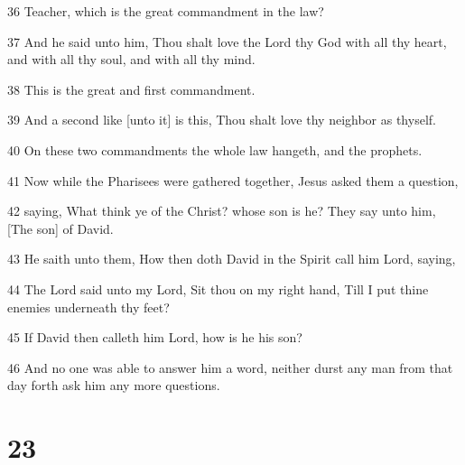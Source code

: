 \par 36 Teacher, which is the great commandment in the law?
\par 37 And he said unto him, Thou shalt love the Lord thy God with all thy heart, and with all thy soul, and with all thy mind.
\par 38 This is the great and first commandment.
\par 39 And a second like [unto it] is this, Thou shalt love thy neighbor as thyself.
\par 40 On these two commandments the whole law hangeth, and the prophets.
\par 41 Now while the Pharisees were gathered together, Jesus asked them a question,
\par 42 saying, What think ye of the Christ? whose son is he? They say unto him, [The son] of David.
\par 43 He saith unto them, How then doth David in the Spirit call him Lord, saying,
\par 44 The Lord said unto my Lord, Sit thou on my right hand, Till I put thine enemies underneath thy feet?
\par 45 If David then calleth him Lord, how is he his son?
\par 46 And no one was able to answer him a word, neither durst any man from that day forth ask him any more questions.

\chapter{23}

